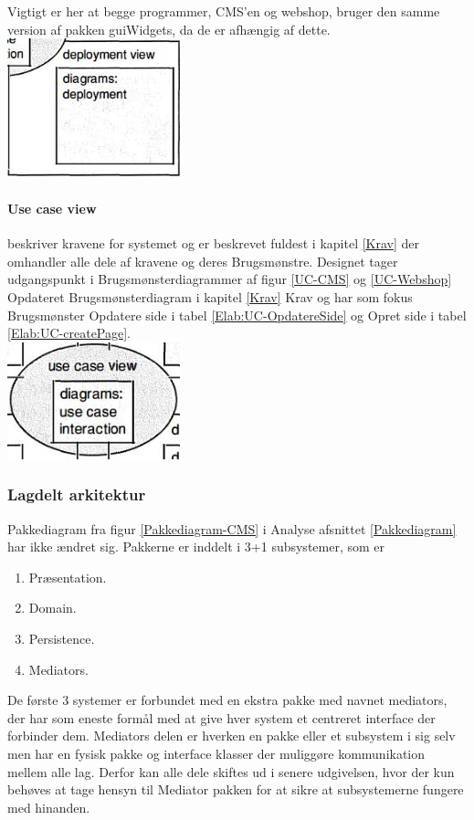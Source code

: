 Vigtigt er her at begge programmer, CMS'en og webshop, bruger den samme version af pakken guiWidgets, da de er afhængig af dette.
 	 \\
     \includegraphics[width=5cm]{elaborationsdokumentet/figurer/design/soft-ark/UML2-DeploymentView.JPG}

\paragraph{Use case view} beskriver kravene for systemet og er beskrevet fuldest i kapitel \ref{Krav} der omhandler alle dele af kravene og deres Brugsmønstre. Designet tager udgangspunkt i Brugsmønsterdiagrammer af figur \ref{UC-CMS} og \ref{UC-Webshop} Opdateret Brugsmønsterdiagram i kapitel \ref{Krav} Krav og har som fokus Brugsmønster Opdatere side i tabel \ref{Elab:UC-OpdatereSide} og Opret side i tabel \ref{Elab:UC-createPage}. 
	\\
 	 \includegraphics[width=5cm]{elaborationsdokumentet/figurer/design/soft-ark/UML2-UsecaseView.JPG}

\subsubsection{Lagdelt arkitektur} \label{Lagdeltarkitektur}
Pakkediagram fra figur \ref{Pakkediagram-CMS} i Analyse afsnittet \ref{Pakkediagram} har ikke ændret sig. Pakkerne er inddelt i 3+1 subsystemer, som er 
\begin{enumerate}
\item Præsentation.
\item Domain.
\item Persistence.
\item Mediators.
\end{enumerate}
De første 3 systemer er forbundet med en ekstra pakke med navnet mediators, der har som eneste formål med at give hver system et centreret interface der forbinder dem. Mediators delen er hverken en pakke eller et subsystem i sig selv men har en fysisk pakke og interface klasser der muliggøre kommunikation mellem alle lag. Derfor kan alle dele skiftes ud i senere udgivelsen, hvor der kun behøves at tage hensyn til Mediator pakken for at sikre at subsystemerne fungere med hinanden. 

